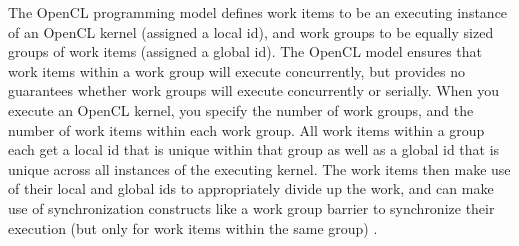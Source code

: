 \documentclass[conference,10pt]{IEEEtran}
\begin{document}
%
%


The OpenCL programming model defines work items to be an executing instance of an OpenCL kernel 
(assigned a local id), and work groups to be equally sized groups of work items (assigned a global 
id). The OpenCL model ensures that work items within a work group will execute concurrently, but 
provides no guarantees whether work groups will execute concurrently or serially. When you execute 
an OpenCL kernel, you specify the number of work groups, and the number of work items within each 
work group. All work items within a group each get a local id that is unique within that group as 
well as a global id that is unique across all instances of the executing kernel. The work items then 
make use of their local and global ids to appropriately divide up the work, and can make use of 
synchronization constructs like a work group barrier to synchronize their execution (but only for 
work items within the same group) \cite{opencl_guide}.
\end{document}
